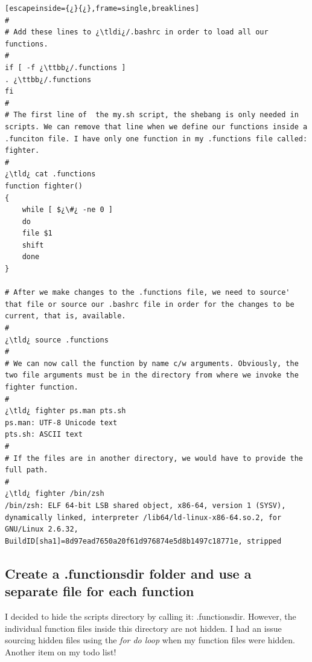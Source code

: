 \begin{lstlisting}[escapeinside={¿}{¿},frame=single,breaklines]
#
# Add these lines to ¿\tldi¿/.bashrc in order to load all our functions.
#
if [ -f ¿\ttbb¿/.functions ]
. ¿\ttbb¿/.functions
fi
#
# The first line of  the my.sh script, the shebang is only needed in scripts. We can remove that line when we define our functions inside a .funciton file. I have only one function in my .functions file called: fighter. 
#
¿\tld¿ cat .functions
function fighter() 
{
	while [ $¿\#¿ -ne 0 ]
	do
	file $1
	shift
	done
}

# After we make changes to the .functions file, we need to source' that file or source our .bashrc file in order for the changes to be current, that is, available.
#
¿\tld¿ source .functions
#
# We can now call the function by name c/w arguments. Obviously, the two file arguments must be in the directory from where we invoke the fighter function.
#
¿\tld¿ fighter ps.man pts.sh
ps.man: UTF-8 Unicode text
pts.sh: ASCII text
#
# If the files are in another directory, we would have to provide the full path.
#
¿\tld¿ fighter /bin/zsh
/bin/zsh: ELF 64-bit LSB shared object, x86-64, version 1 (SYSV), dynamically linked, interpreter /lib64/ld-linux-x86-64.so.2, for GNU/Linux 2.6.32, BuildID[sha1]=8d97ead7650a20f61d976874e5d8b1497c18771e, stripped
\end{lstlisting}

\subsection{Create a .functionsdir folder and use a separate file for each function}

I decided to hide the scripts directory by calling it: .functionsdir. However, the individual function files inside this directory are not hidden. I had an issue sourcing hidden files using the \emph{for do loop} when my function files were hidden. Another item on my todo list!


